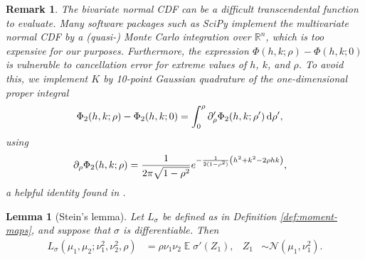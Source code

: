 \documentclass{article}
\newtheorem{remark}{Remark}
\newtheorem{lemma}{Lemma}
\DeclareMathOperator{\expect}{\mathbb{E}}
\begin{document}
\begin{remark}
  The bivariate normal CDF can be a difficult transcendental function
  to evaluate.
  Many software packages such as SciPy \citep{wagner_kalman_2022}
  implement the multivariate normal CDF by a (quasi-) Monte Carlo
  integration over \(\mathbb{R}^n\), which is too expensive for our purposes.
  Furthermore, the expression \(\Phi(h, k; \rho) - \Phi(h, k; 0)\) is
  vulnerable to cancellation error for extreme values of \(h\),
  \(k\), and \(\rho\).
  To avoid this, we implement \(K\) by 10-point Gaussian quadrature
  of the one-dimensional proper integral
  \begin{align*}
    \Phi_2(h, k; \rho) -
    \Phi_2(h, k; 0)
    &= \int_0^\rho \partial_\rho' \Phi_2(h, k; \rho') \dif\rho',
  \end{align*}
  using
  \begin{align*}
    \partial_\rho \Phi_2(h, k; \rho)
    &= \frac{1}{2\pi \sqrt{1 - \rho^2}} e^{-\frac{1}{2(1 - \rho^2)}
    \del{h^2 + k^2 - 2 \rho h k}},
  \end{align*}
  a helpful identity found in \citet{drezner_computation_1990}.
\end{remark}


\begin{lemma}[Stein's lemma]
  \label{lem:stein}
  Let \(L_\sigma\) be defined as in Definition \ref{def:moment-maps}, and suppose that \(\sigma\) is differentiable.
  Then
  \begin{align*}
    L_\sigma(\mu_1, \mu_2; \nu_1^2, \nu_2^2, \rho) &= \rho
    \nu_1 \nu_2 \expect \sigma'(Z_1),
    & Z_1 &\sim \mathcal N(\mu_1, \nu^2_1).
  \end{align*}
\end{lemma}
\end{document}
